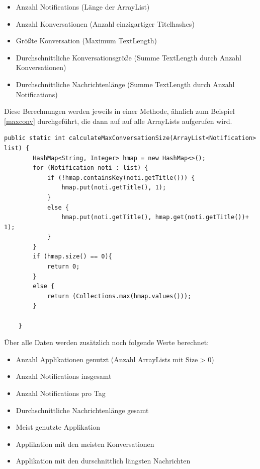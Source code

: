 \begin{itemize}
  \item Anzahl Notifications (Länge der ArrayList)
  \item Anzahl Konversationen (Anzahl einzigartiger Titelhashes)
  \item Größte Konversation (Maximum TextLength)
  \item Durchschnittliche Konversationsgröße (Summe TextLength durch Anzahl Konversationen)
  \item Durchschnittliche Nachrichtenlänge (Summe TextLength durch Anzahl Notifications)
\end{itemize}

Diese Berechnungen werden jeweils in einer Methode, ähnlich zum Beispiel \ref{maxconv} durchgeführt, die dann auf auf alle ArrayLists aufgerufen wird.


\begin{lstlisting}[frame=single, caption =  calculateMaxConversationSize(), label=maxconv] 
    public static int calculateMaxConversationSize(ArrayList<Notification> list) {
        HashMap<String, Integer> hmap = new HashMap<>();
        for (Notification noti : list) {
            if (!hmap.containsKey(noti.getTitle())) {
                hmap.put(noti.getTitle(), 1);
            }
            else {
                hmap.put(noti.getTitle(), hmap.get(noti.getTitle())+ 1);
            }
        }
        if (hmap.size() == 0){
            return 0;
        }
        else {
            return (Collections.max(hmap.values()));
        }

    }
\end{lstlisting}


Über alle Daten werden zusätzlich noch folgende Werte berechnet:

\begin{itemize}
  \item Anzahl Applikationen genutzt (Anzahl ArrayLists mit Size > 0)
  \item Anzahl Notifications insgesamt
  \item Anzahl Notifications pro Tag
  \item Durchschnittliche Nachrichtenlänge gesamt
  \item Meist genutzte Applikation
  \item Applikation mit den meisten Konversationen
  \item Applikation mit den durschnittlich längsten Nachrichten  
\end{itemize}


